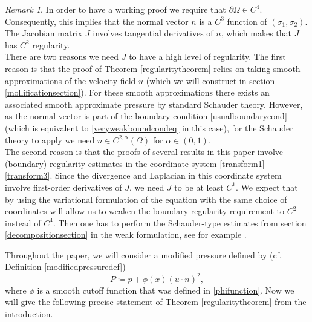 \documentclass[12pt,a4paper]{article}
\theoremstyle{definition}
\theoremstyle{remark}
\newtheorem{remark}[theorem]{Remark}
\numberwithin{equation}{section}
\begin{document}
\begin{remark} \label{boundaryregularityremark}
In order to have a working proof we require that $\partial \Omega \in C^4$. Consequently, this implies that the normal vector $n$ is a $C^3$ function of $(\sigma_1, \sigma_2)$. The Jacobian matrix $J$ involves tangential derivatives of $n$, which makes that $J$ has $C^2$ regularity. \\
There are two reasons we need $J$ to have a high level of regularity. The first reason is that the proof of Theorem \ref{regularitytheorem} relies on taking smooth approximations of the velocity field $u$ (which we will construct in section \ref{mollificationsection}). For these smooth approximations there exists an associated smooth approximate pressure by standard Schauder theory. However, as the normal vector is part of the boundary condition \eqref{usualboundarycond} (which is equivalent to \eqref{veryweakboundcondeq} in this case), for the Schauder theory to apply we need $n \in C^{2,\alpha} (\Omega)$ for $\alpha \in (0,1)$.  \\ 
The second reason is that the proofs of several results in this paper involve (boundary) regularity estimates in the coordinate system \eqref{transform1}-\eqref{transform3}. Since the divergence and Laplacian in this coordinate system involve first-order derivatives of $J$, we need $J$ to be at least $C^1$. We expect that by using the variational formulation of the equation with the same choice of coordinates will allow us to weaken the boundary regularity requirement to $C^2$ instead of $C^4$. Then one has to perform the Schauder-type estimates from section \ref{decompositionsection} in the weak formulation, see for example \cite{giaquinta}.
\end{remark}
Throughout the paper, we will consider a modified pressure defined by (cf. Definition \ref{modifiedpressuredef})
\begin{equation}
P \coloneqq p + \phi (x) (u \cdot n)^2,
\end{equation}
where $\phi$ is a smooth cutoff function that was defined in \eqref{phifunction}. Now we will give the following precise statement of Theorem \ref{regularitytheorem} from the introduction.
\end{document}
